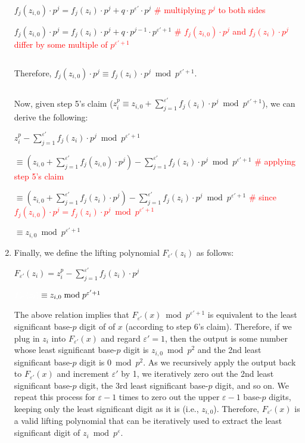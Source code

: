 \begin{enumerate}
\begin{myproof}
$f_j(z_{i,0})\cdot p^j = f_j(z_i)\cdot p^j + q\cdot p^{\varepsilon'}\cdot p^j$ \textcolor{red}{ \# multiplying $p^j$ to both sides}

$f_j(z_{i,0})\cdot p^j = f_j(z_i)\cdot p^j + q\cdot p^{j-1} \cdot p^{\varepsilon'+1}$ \textcolor{red}{ \# $f_j(z_{i,0})\cdot p^j$ and $f_j(z_i)\cdot p^j$ differ by some multiple of $p^{\varepsilon' + 1}$}

$ $

Therefore, $f_j(z_{i,0})\cdot p^j \equiv f_j(z_i)\cdot p^j \bmod p^{\varepsilon' + 1}$.

$ $

Now, given step 5's claim ($z_i^p \equiv z_{i,0} + \sum\limits_{j=1}^{\varepsilon'}f_j(z_{i})\cdot p^j \bmod p^{\varepsilon'+1}$), we can derive the following:

$z_i^p - \sum\limits_{j=1}^{\varepsilon'}f_j(z_{i})\cdot p^j \bmod p^{\varepsilon' + 1}$

$\equiv (z_{i,0} + \sum\limits_{j=1}^{\varepsilon'}f_j(z_{i,0})\cdot p^j) - \sum\limits_{j=1}^{\varepsilon'}f_j(z_{i})\cdot p^j \bmod p^{\varepsilon' + 1}$ \textcolor{red}{ \# applying step 5's claim}

$\equiv (z_{i,0} + \sum\limits_{j=1}^{\varepsilon'}f_j(z_i)\cdot p^j) - \sum\limits_{j=1}^{\varepsilon'}f_j(z_i)\cdot p^j \bmod p^{\varepsilon' + 1}$ \textcolor{red}{ \# since $f_j(z_{i,0})\cdot p^j = f_j(z_i)\cdot p^j \bmod p^{\varepsilon' + 1}$}

$\equiv z_{i,0} \bmod p^{\varepsilon' + 1}$

\end{myproof}

\item Finally, we define the lifting polynomial $F_{\varepsilon'}(z_i)$ as follows:

$F_{\varepsilon'}(z_i) = z_i^p - \sum\limits_{j=1}^{\varepsilon'}f_j(z_i)\cdot p^j$

$\textcolor{white}{F_{\varepsilon'}(z_i) } \equiv z_{i,0} \bmod p^{\varepsilon' + 1}$


The above relation implies that $F_{\varepsilon'}(x) \bmod p^{\varepsilon'+1}$ is equivalent to the least significant base-$p$ digit of of $x$ (according to step 6's claim). Therefore, if we plug in $z_i$ into $F_{\varepsilon'}(x)$ and regard $\varepsilon' = 1$, then the output is some number whose least significant base-$p$ digit is $z_{i,0} \bmod p^2$ and the 2nd least significant base-$p$ digit is $0 \bmod p^2$. As we recursively apply the output back to $F_{\varepsilon'}(x)$ and increment $\varepsilon'$ by 1, we iteratively zero out the 2nd least significant base-$p$ digit, the 3rd least significant base-$p$ digit, and so on. We repeat this process for $\varepsilon-1$ times to zero out the upper $\varepsilon-1$ base-$p$ digits, keeping only the least significant digit as it is (i.e., $z_{i,0}$). Therefore, $F_{\varepsilon'}(x)$ is a valid lifting polynomial that can be iteratively used to extract the least significant digit of $z_i \bmod p^\varepsilon$. 


\end{enumerate}

